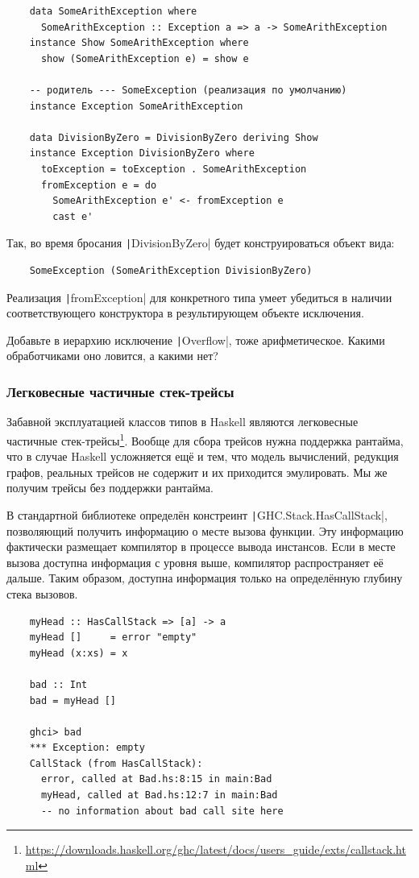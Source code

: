 \begin{verbatim}
    data SomeArithException where
      SomeArithException :: Exception a => a -> SomeArithException
    instance Show SomeArithException where
      show (SomeArithException e) = show e

    -- родитель --- SomeException (реализация по умолчанию)
    instance Exception SomeArithException

    data DivisionByZero = DivisionByZero deriving Show
    instance Exception DivisionByZero where
      toException = toException . SomeArithException
      fromException e = do
        SomeArithException e' <- fromException e
        cast e'
\end{verbatim}

Так, во время бросания \texttt|DivisionByZero| будет конструироваться объект вида:
\begin{verbatim}
    SomeException (SomeArithException DivisionByZero)
\end{verbatim}
Реализация \texttt|fromException| для конкретного типа умеет убедиться в наличии соответствующего конструктора в результирующем объекте исключения.

\begin{task}
    Добавьте в иерархию исключение \texttt|Overflow|, тоже арифметическое.
    Какими обработчиками оно ловится, а какими нет?
\end{task}

\subsubsection{Легковесные частичные стек-трейсы}

Забавной эксплуатацией классов типов в Haskell являются легковесные частичные стек-трейсы\footnote{\url{https://downloads.haskell.org/ghc/latest/docs/users_guide/exts/callstack.html}}.
Вообще для сбора трейсов нужна поддержка рантайма, что в случае Haskell усложняется ещё и тем, что модель вычислений, редукция графов, реальных трейсов не содержит и их приходится эмулировать.
Мы же получим трейсы без поддержки рантайма.

В стандартной библиотеке определён констреинт \texttt|GHC.Stack.HasCallStack|, позволяющий получить информацию о месте вызова функции.
Эту информацию фактически размещает компилятор в процессе вывода инстансов.
Если в месте вызова доступна информация с уровня выше, компилятор распространяет её дальше.
Таким образом, доступна информация только на определённую глубину стека вызовов.
\begin{verbatim}
    myHead :: HasCallStack => [a] -> a
    myHead []     = error "empty"
    myHead (x:xs) = x

    bad :: Int
    bad = myHead []

    ghci> bad
    *** Exception: empty
    CallStack (from HasCallStack):
      error, called at Bad.hs:8:15 in main:Bad
      myHead, called at Bad.hs:12:7 in main:Bad
      -- no information about bad call site here
\end{verbatim}

